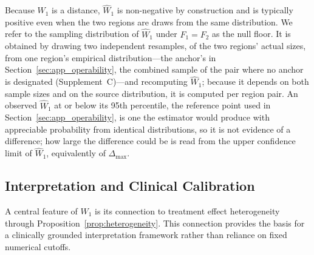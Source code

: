 \documentclass[AMA,Times1COL]{WileyNJDv5}
\begin{document}
Because $W_1$ is a distance, $\widehat{W}_1$ is non-negative by construction and is typically positive even when the two regions are draws from the same distribution. We refer to the sampling distribution of $\widehat{W}_1$ under $F_1 = F_2$ as the null floor. It is obtained by drawing two independent resamples, of the two regions' actual sizes, from one region's empirical distribution---the anchor's in Section~\ref{sec:app_operability}, the combined sample of the pair where no anchor is designated (Supplement~C)---and recomputing $\widehat{W}_1$; because it depends on both sample sizes and on the source distribution, it is computed per region pair. An observed $\widehat{W}_1$ at or below its 95th percentile, the reference point used in Section~\ref{sec:app_operability}, is one the estimator would produce with appreciable probability from identical distributions, so it is not evidence of a difference; how large the difference could be is read from the upper confidence limit of $\widehat{W}_1$, equivalently of $\Delta_{\max}$.

\subsection{Interpretation and Clinical Calibration}\label{sec:inference}

A central feature of $W_1$ is its connection to treatment effect heterogeneity through Proposition~\ref{prop:heterogeneity}. This connection provides the basis for a clinically grounded interpretation framework rather than reliance on fixed numerical cutoffs.
\end{document}
